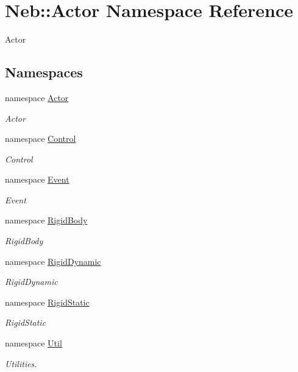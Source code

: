 \hypertarget{namespaceNeb_1_1Actor}{\section{\-Neb\-:\-:\-Actor \-Namespace \-Reference}
\label{namespaceNeb_1_1Actor}
}


\-Actor  


\subsection*{\-Namespaces}
\begin{DoxyCompactItemize}
\item 
namespace \hyperlink{namespaceNeb_1_1Actor_1_1Actor}{\-Actor}
\begin{DoxyCompactList}\small\item\em \-Actor \end{DoxyCompactList}\item 
namespace \hyperlink{namespaceNeb_1_1Actor_1_1Control}{\-Control}
\begin{DoxyCompactList}\small\item\em \-Control \end{DoxyCompactList}\item 
namespace \hyperlink{namespaceNeb_1_1Actor_1_1Event}{\-Event}
\begin{DoxyCompactList}\small\item\em \-Event \end{DoxyCompactList}\item 
namespace \hyperlink{namespaceNeb_1_1Actor_1_1RigidBody}{\-Rigid\-Body}
\begin{DoxyCompactList}\small\item\em \-Rigid\-Body \end{DoxyCompactList}\item 
namespace \hyperlink{namespaceNeb_1_1Actor_1_1RigidDynamic}{\-Rigid\-Dynamic}
\begin{DoxyCompactList}\small\item\em \-Rigid\-Dynamic \end{DoxyCompactList}\item 
namespace \hyperlink{namespaceNeb_1_1Actor_1_1RigidStatic}{\-Rigid\-Static}
\begin{DoxyCompactList}\small\item\em \-Rigid\-Static \end{DoxyCompactList}\item 
namespace \hyperlink{namespaceNeb_1_1Actor_1_1Util}{\-Util}
\begin{DoxyCompactList}\small\item\em \-Utilities. \end{DoxyCompactList}\end{DoxyCompactItemize}
